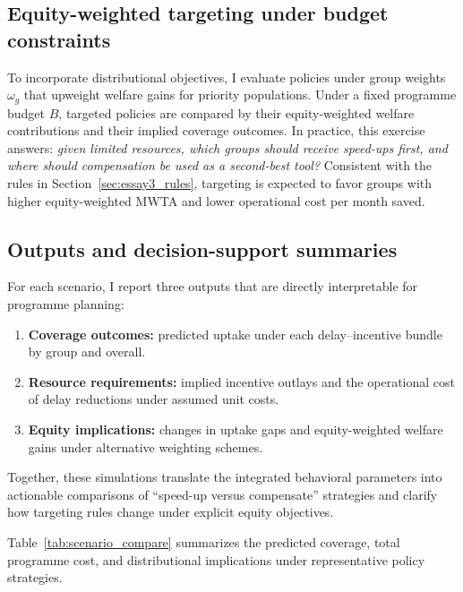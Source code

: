 \documentclass[doublespacing]{utdthesis}
\begin{document}
\subsection{Equity-weighted targeting under budget constraints}
\label{subsec:essay3_budgeted_equity}

To incorporate distributional objectives, I evaluate policies under group weights $\omega_g$ that upweight welfare gains for priority populations. Under a fixed programme budget $B$, targeted policies are compared by their equity-weighted welfare contributions and their implied coverage outcomes. In practice, this exercise answers: \emph{given limited resources, which groups should receive speed-ups first, and where should compensation be used as a second-best tool?} Consistent with the rules in Section~\ref{sec:essay3_rules}, targeting is expected to favor groups with higher equity-weighted MWTA and lower operational cost per month saved.

\subsection{Outputs and decision-support summaries}
\label{subsec:essay3_outputs}

For each scenario, I report three outputs that are directly interpretable for programme planning:
\begin{enumerate}
\item \textbf{Coverage outcomes:} predicted uptake under each delay--incentive bundle by group and overall.
\item \textbf{Resource requirements:} implied incentive outlays and the operational cost of delay reductions under assumed unit costs.
\item \textbf{Equity implications:} changes in uptake gaps and equity-weighted welfare gains under alternative weighting schemes.
\end{enumerate}

Together, these simulations translate the integrated behavioral parameters into actionable comparisons of ``speed-up versus compensate'' strategies and clarify how targeting rules change under explicit equity objectives.


Table~\ref{tab:scenario_compare} summarizes the predicted coverage,
total programme cost, and distributional implications under
representative policy strategies.
\end{document}
